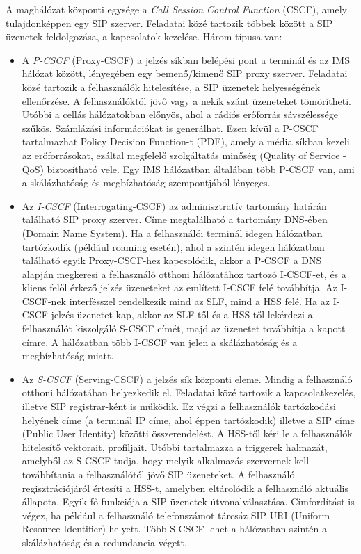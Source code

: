 A maghálózat központi egysége a \emph{Call Session Control Function} (CSCF), amely tulajdonképpen egy SIP szerver. Feladatai közé tartozik többek között a SIP üzenetek feldolgozása, a kapcsolatok kezelése. Három típusa van:
\begin{itemize}
\item A \emph{P-CSCF} (Proxy-CSCF) a jelzés síkban belépési pont a terminál és az IMS hálózat között, lényegében egy bemenő/kimenő SIP proxy szerver. Feladatai közé tartozik a felhasználók hitelesítése, a SIP üzenetek helyességének ellenőrzése. A felhasználóktól jövő vagy a nekik szánt üzeneteket tömörítheti. Utóbbi a cellás hálózatokban előnyös, ahol a rádiós erőforrás sávszélessége szűkös. Számlázási információkat is generálhat. Ezen kívül a P-CSCF tartalmazhat Policy Decision Function-t (PDF), amely a média síkban kezeli az erőforrásokat, ezáltal megfelelő szolgáltatás minőség (Quality of Service - QoS) biztosítható vele. Egy IMS hálózatban általában több P-CSCF van, ami a skálázhatóság és megbízhatóság szempontjából lényeges.
\item Az \emph{I-CSCF} (Interrogating-CSCF) az adminisztratív tartomány határán található SIP proxy szerver. Címe megtalálható a tartomány DNS-ében (Domain Name System). Ha a felhasználói terminál idegen hálózatban tartózkodik (például roaming esetén), ahol a szintén idegen hálózatban található egyik Proxy-CSCF-hez kapcsolódik, akkor a P-CSCF a DNS alapján megkeresi a felhasználó otthoni hálózatához tartozó I-CSCF-et, és a kliens felől érkező jelzés üzeneteket az említett I-CSCF felé továbbítja. Az I-CSCF-nek interfésszel rendelkezik mind az SLF, mind a HSS felé. Ha az I-CSCF jelzés üzenetet kap, akkor az SLF-től és a HSS-től lekérdezi a felhasználót kiszolgáló S-CSCF címét, majd az üzenetet továbbítja a kapott címre. A hálózatban több I-CSCF van jelen a skálázhatóság és a megbízhatóság miatt.
\item Az \emph{S-CSCF} (Serving-CSCF) a jelzés sík központi eleme. Mindig a felhasználó otthoni hálózatában helyezkedik el. Feladatai közé tartozik a kapcsolatkezelés, illetve SIP registrar-ként is működik. Ez végzi a felhasználók tartózkodási helyének címe (a terminál IP címe, ahol éppen tartózkodik) illetve a SIP címe (Public User Identity) közötti összerendelést. A HSS-től kéri le a felhasználók hitelesítő vektorait, profiljait. Utóbbi tartalmazza a triggerek halmazát, amelyből az S-CSCF tudja, hogy melyik alkalmazás szervernek kell továbbítania a felhasználótól jövő SIP üzeneteket. A felhasználó regisztrációjáról értesíti a HSS-t, amelyben eltárolódik a felhasználó aktuális állapota. Egyik fő funkciója a SIP üzenetek útvonalválasztása. Címfordítást is végez, ha például a felhasználó telefonszámot tárcsáz SIP URI (Uniform Resource Identifier) helyett. Több S-CSCF lehet a hálózatban szintén a skálázhatóság és a redundancia végett.
\end{itemize}

